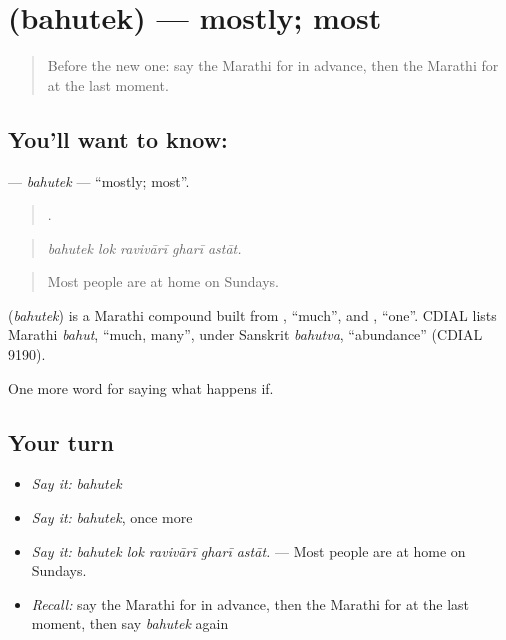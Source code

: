 \section[\texorpdfstring{\mr{बहुतेक} (bahutek)}{बहुतेक (bahutek)}]{ (bahutek) — mostly; most}

\label{lesson:MR-C554-bahutek}



\begin{quote}
Before the new one: say the Marathi for in advance, then the Marathi for at the last moment.
\end{quote}

\subsection*{You'll want to know: }
\textbf{} — \emph{bahutek} — \textquotedblleft{}mostly; most\textquotedblright{}.

\begin{quote}
    .
\end{quote}

\begin{quote}
\emph{bahutek lok ravivārī gharī astāt.}
\end{quote}

\begin{quote}
Most people are at home on Sundays.
\end{quote}

\begin{cousinweb}
\textbf{} (\emph{bahutek}) is a Marathi compound built from , \textquotedblleft{}much\textquotedblright{}, and , \textquotedblleft{}one\textquotedblright{}. CDIAL lists Marathi \emph{bahut}, \textquotedblleft{}much, many\textquotedblright{}, under Sanskrit \emph{bahutva}, \textquotedblleft{}abundance\textquotedblright{} (CDIAL 9190).
\end{cousinweb}

\begin{grammarlens}[title={What you've built}]
One more word for saying what happens if.
\end{grammarlens}

\subsection*{Your turn}
\begin{itemize}
\raggedright
  \item \emph{Say it:} \emph{bahutek}
  \item \emph{Say it:} \emph{bahutek}, once more
  \item \emph{Say it:} \emph{bahutek lok ravivārī gharī astāt.} — Most people are at home on Sundays.
  \item \emph{Recall:} say the Marathi for in advance, then the Marathi for at the last moment, then say \emph{bahutek} again
\end{itemize}

